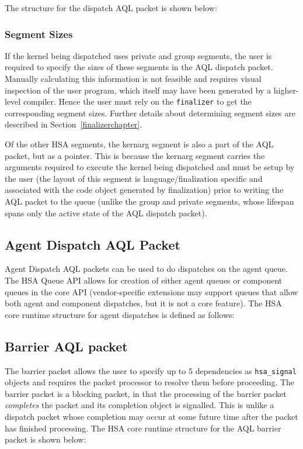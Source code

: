 The structure for the dispatch AQL packet is shown below:



\hypertarget{segment_sizes}{}\subsubsection{Segment
Sizes}\label{segment_sizes}
If the kernel being dispatched uses private and group segments, the
user is required to specify the sizes of these segments in the AQL
dispatch packet. Manually calculating this information is not 
feasible and requires visual inspection of the user program, which itself
may have been generated by a higher-level compiler. Hence the user
must rely on the \texttt{finalizer} to get the corresponding segment
sizes. Further details about determining segment sizes are described in
Section~\ref{finalizerchapter}.

Of the other HSA segments, the kernarg segment is also a part of
the AQL packet, but as a pointer. This is because the kernarg segment
carries the arguments required to execute the kernel being
dispatched and must be setup by the user (the layout of this
segment is language/finalization specific and associated with the
code object generated by finalization) prior to writing the AQL
packet to the queue (unlike the group and private segments, whose
lifespan spans only the active state of the AQL dispatch packet).
\DIFaddbegin {}\DIFaddend 

\hypertarget{agent_packet}{}\subsection{Agent Dispatch AQL
Packet}\label{agent_packet}
Agent Dispatch AQL packets can be used to do dispatches on the agent
queue. The HSA Queue API allows for creation of either agent queues
or component queues in the core API (vendor-specific extensions may
support queues that allow both agent and component dispatches, but
it is not a core feature). The HSA core runtime structure for agent
dispatches is defined as follows:



\hypertarget{barrier_packet}{}\subsection{Barrier AQL
packet}\label{barrier_packet} 
The barrier packet allows the user to specify up to 5 dependencies
as \texttt{hsa\_signal} objects and requires the packet processor to
resolve them before proceeding. The barrier packet is a blocking
packet, in that the processing of the barrier packet
\emph{completes} the packet and its completion object is signalled.
This is unlike a dispatch packet whose completion may occur at some
future time after the packet has finished processing. The HSA core
runtime structure for the AQL barrier packet is shown below:

